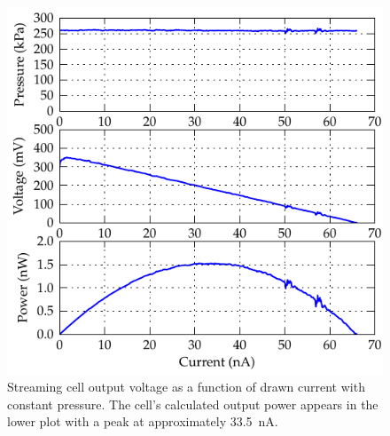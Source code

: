\documentclass[10pt,final,journal]{IEEEtran}
\begin{document}
        \begin{figure}
            \begin{center}
            \includegraphics[width=\linewidth]{graph_cellOutput}
            \end{center}
            \caption{Streaming cell output voltage as a function of drawn current with constant pressure.
            The cell's calculated output power appears in the lower plot with a peak at approximately \SI{33.5}{\nano\ampere}.}
            \label{fig:cellOutput}
        \end{figure}


\end{document}
